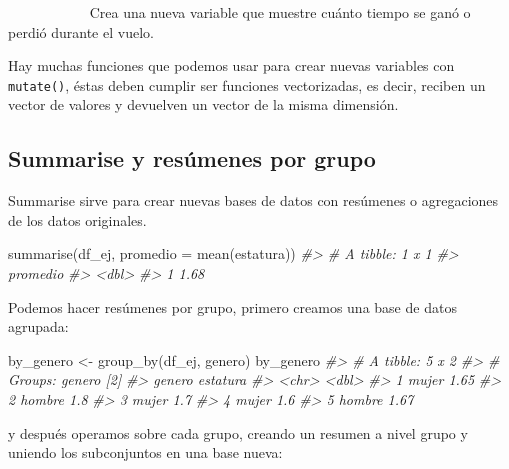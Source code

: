 \documentclass[
]{book}
\newenvironment{Shaded}{\begin{snugshade}}{\end{snugshade}}
\newcommand{\AttributeTok}[1]{\textcolor[rgb]{0.77,0.63,0.00}{#1}}
\newcommand{\CommentTok}[1]{\textcolor[rgb]{0.56,0.35,0.01}{\textit{#1}}}
\newcommand{\FunctionTok}[1]{\textcolor[rgb]{0.00,0.00,0.00}{#1}}
\newcommand{\NormalTok}[1]{#1}
\newcommand{\OtherTok}[1]{\textcolor[rgb]{0.56,0.35,0.01}{#1}}
\begin{document}
~~~~~~~~~~~ Crea una nueva
variable que muestre cuánto tiempo se ganó o perdió durante el vuelo.

Hay muchas funciones que podemos usar para crear nuevas variables con \texttt{mutate()}, éstas deben cumplir ser funciones vectorizadas, es decir, reciben un vector de valores y devuelven un vector de la misma dimensión.

\hypertarget{summarise-y-resuxfamenes-por-grupo}{%
\subsection*{Summarise y resúmenes por grupo}\label{summarise-y-resuxfamenes-por-grupo}}

Summarise sirve para crear nuevas bases de datos con resúmenes o agregaciones de
los datos originales.

\begin{Shaded}
\begin{Highlighting}[]
\FunctionTok{summarise}\NormalTok{(df\_ej, }\AttributeTok{promedio =} \FunctionTok{mean}\NormalTok{(estatura))}
\CommentTok{\#\textgreater{} \# A tibble: 1 x 1}
\CommentTok{\#\textgreater{}   promedio}
\CommentTok{\#\textgreater{}      \textless{}dbl\textgreater{}}
\CommentTok{\#\textgreater{} 1     1.68}
\end{Highlighting}
\end{Shaded}

Podemos hacer resúmenes por grupo, primero creamos una base de datos agrupada:

\begin{Shaded}
\begin{Highlighting}[]
\NormalTok{by\_genero }\OtherTok{\textless{}{-}} \FunctionTok{group\_by}\NormalTok{(df\_ej, genero)}
\NormalTok{by\_genero}
\CommentTok{\#\textgreater{} \# A tibble: 5 x 2}
\CommentTok{\#\textgreater{} \# Groups:   genero [2]}
\CommentTok{\#\textgreater{}   genero estatura}
\CommentTok{\#\textgreater{}   \textless{}chr\textgreater{}     \textless{}dbl\textgreater{}}
\CommentTok{\#\textgreater{} 1 mujer      1.65}
\CommentTok{\#\textgreater{} 2 hombre     1.8 }
\CommentTok{\#\textgreater{} 3 mujer      1.7 }
\CommentTok{\#\textgreater{} 4 mujer      1.6 }
\CommentTok{\#\textgreater{} 5 hombre     1.67}
\end{Highlighting}
\end{Shaded}

y después operamos sobre cada grupo, creando un resumen a nivel grupo y uniendo
los subconjuntos en una base nueva:
\end{document}
